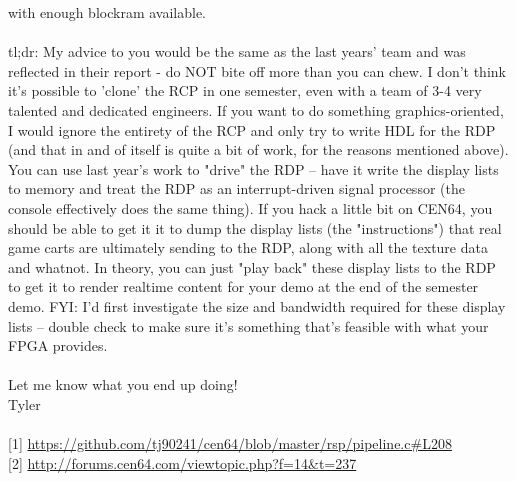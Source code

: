 \documentclass[11pt,a4paper]{article}
\begin{document}
	with enough blockram available.\\\\
	tl;dr: My advice to you would be the same as the last years' team and
	was reflected in their report - do NOT bite off more than you can
	chew. I don't think it's possible to 'clone' the RCP in one semester,
	even with a team of 3-4 very talented and dedicated engineers. If you
	want to do something graphics-oriented, I would ignore the entirety of
	the RCP and only try to write HDL for the RDP (and that in and of
	itself is quite a bit of work, for the reasons mentioned above). You
	can use last year's work to "drive" the RDP -- have it write the
	display lists to memory and treat the RDP as an interrupt-driven
	signal processor (the console effectively does the same thing). If you
	hack a little bit on CEN64, you should be able to get it it to dump
	the display lists (the "instructions") that real game carts are
	ultimately sending to the RDP, along with all the texture data and
	whatnot. In theory, you can just "play back" these display lists to
	the RDP to get it to render realtime content for your demo at the end
	of the semester demo. FYI: I'd first investigate the size and
	bandwidth required for these display lists -- double check to make
	sure it's something that's feasible with what your FPGA provides.\\\\
	
	Let me know what you end up doing!\\
	Tyler\\\\
	
	[1] \url{https://github.com/tj90241/cen64/blob/master/rsp/pipeline.c\#L208}\\
	
	[2] \url{http://forums.cen64.com/viewtopic.php?f=14\&t=237}
	
	
	\newpage
\end{document}
